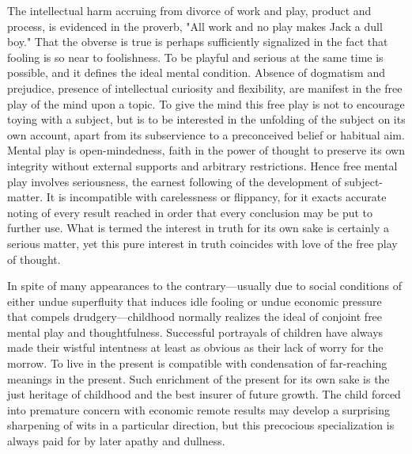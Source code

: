 \documentclass[showtrims,ustradepaper]{memoir}
\begin{document}



The intellectual harm accruing from divorce of work and play, product
and process, is evidenced in the proverb, "All work and no play makes
Jack a dull boy." That the obverse is true is perhaps sufficiently
signalized in the fact that fooling is so near to foolishness. To be
playful and serious at the same time is possible, and it defines the
ideal mental condition. Absence of dogmatism and prejudice, presence of
intellectual curiosity and flexibility, are manifest in the free play of
the mind upon a topic. To give the mind
this
free play is not to encourage toying with a subject, but is to be
interested in the unfolding of the subject on its own account, apart
from its subservience to a preconceived belief or habitual aim. Mental
play is open-mindedness, faith in the power of thought to preserve its
own integrity without external supports and arbitrary restrictions.
Hence free mental play involves seriousness, the earnest following of
the development of subject-matter. It is incompatible with carelessness
or flippancy, for it exacts accurate noting of every result reached in
order that every conclusion may be put to further use. What is termed
the interest in truth for its own sake is certainly a serious matter,
yet this pure interest in truth coincides with love of the free play of
thought.

In spite of many appearances to the contrary---usually due to social
conditions of either undue superfluity that induces idle fooling or
undue economic pressure that compels drudgery---childhood normally
realizes the ideal of conjoint free mental play and thoughtfulness.
Successful portrayals of children have always made their wistful
intentness at least as obvious as their lack of worry for the morrow. To
live in the present is compatible with condensation of far-reaching
meanings in the present. Such enrichment of the present for its own sake
is the just heritage of childhood and the best insurer of future growth.
The child forced into premature concern with economic remote results may
develop a surprising sharpening of wits in a particular direction, but
this precocious specialization is always paid for by later apathy and
dullness.

\end{document}
